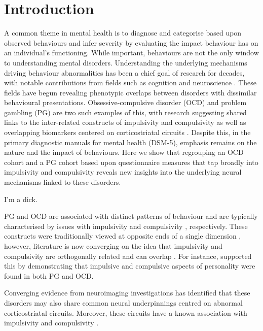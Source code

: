 \section{Introduction}

A common theme in mental health is to diagnose and categorise based upon observed behaviours and infer severity by evaluating the impact behaviour has on an individual's functioning. While important, behaviours are not the only window to understanding mental disorders. Understanding the underlying mechanisms driving behaviour abnormalities has been a chief goal of research for decades, with notable contributions from fields such as cognition and neuroscience \cite{Frank_2015}. These fields have begun revealing phenotypic overlaps between disorders with dissimilar behavioural presentations. Obsessive-compulsive disorder (OCD) and problem gambling (PG) are two such examples of this, with research suggesting shared links to the inter-related constructs of impulsivity and compulsivity \cite{Tavares_2007} as well as overlapping biomarkers centered on corticostriatal circuits \cite{van_Holst_2010,Harrison_2009,Harrison_2013}. Despite this, in the primary diagnostic manuals for mental health (DSM-5), emphasis remains on the nature and the impact of behaviours. Here we show that regrouping an OCD cohort and a PG cohort based upon questionnaire measures that tap broadly into impulsivity and compulsivity reveals new insights into the underlying neural mechanisms linked to these disorders.

I'm a dick.


PG and OCD are associated with distinct patterns of behaviour and are typically characterised by issues with impulsivity \cite{Goudriaan_2004} and compulsivity \cite{Stein_1994}, respectively. These constructs were traditionally viewed at opposite ends of a single dimension \cite{Fineberg_2009}, however, literature is now converging on the idea that impulsivity and compulsivity are orthogonally related and can overlap \cite{Fineberg_2009,Fontenelle_2011}. For instance, \citet{Tavares_2007} supported this by demonstrating that impulsive and compulsive aspects of personality were found in both PG and OCD.


Converging evidence from neuroimaging investigations has identified that these disorders may also share common neural underpinnings centred on abnormal corticostriatal circuits. Moreover, these circuits have a known association with impulsivity and compulsivity \cite{Torregrossa2008}.





